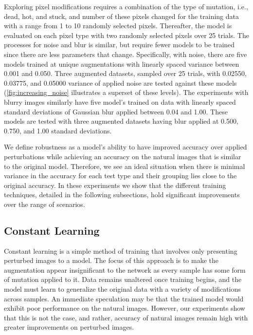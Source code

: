 \documentclass[conference]{IEEEtran}
\begin{document}
Exploring pixel modifications requires a combination of the type of mutation, i.e., dead, hot, and stuck, and number of these pixels changed for the training data with a range from 1 to 10 randomly selected pixels. Thereafter, the model is evaluated on each pixel type with two randomly selected pixels over 25 trials. The processes for noise and blur is similar, but require fewer models to be trained since there are less parameters that change. Specifically, with noise, there are five models trained at unique augmentations with linearly spaced variance between 0.001 and 0.050. Three augmented datasets, sampled over 25 trials, with 0.02550, 0.03775, and 0.05000 variance of applied noise are tested against these models (\autoref{fig:increasing_noise} illustrates a superset of these levels). The experiments with blurry images similarly have five model's trained on data with linearly spaced standard deviations of Gaussian blur applied between 0.04 and 1.00. These models are tested with three augmented datasets having blur applied at 0.500, 0.750, and 1.00 standard deviations.

We define robustness as a model's ability to have improved accuracy over applied perturbations while achieving an accuracy on the natural images that is similar to the original model. Therefore, we see an ideal situation when there is minimal variance in the accuracy for each test type and their grouping lies close to the original accuracy. In these experiments we show that the different training techniques, detailed in the following subsections, hold significant improvements over the range of scenarios.

\subsection{Constant Learning}

Constant learning is a simple method of training that involves only presenting perturbed images to a model. The focus of this approach is to make the augmentation appear insignificant to the network as every sample has some form of mutation applied to it. Data remains unaltered once training begins, and the model must learn to generalize the original data with a variety of modifications across samples. An immediate speculation may be that the trained model would exhibit poor performance on the natural images. However, our experiments show that this is not the case, and rather, accuracy of natural images remain high with greater improvements on perturbed images.
\end{document}
